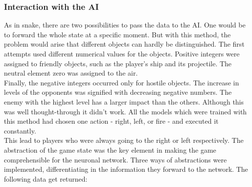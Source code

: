 \documentclass[12pt]{article}
\begin{document}
\subsubsection{Interaction with the AI}
As in snake, there are two possibilities to pass the data to the \gls{AI}. One would be to forward the whole state at a specific moment. But with this method, the problem would arise that different objects can hardly be distinguished. The first attempts used different numerical values for the objects. Positive integers were assigned to friendly objects, such as the player's ship and its projectile. The neutral element zero was assigned to the air. \\
Finally, the negative integers occurred only for hostile objects. The increase in levels of the opponents was signified with decreasing negative numbers. The enemy with the highest level has a larger impact than the others. Although this was well thought-through it didn't work. All the models which were trained with this method had chosen one action - right, left, or fire - and executed it constantly. \\
This lead to players who were always going to the right or left respectively. The abstraction of the game state was the key element in making the game comprehensible for the neuronal network. Three ways of abstractions were implemented, differentiating in the information they forward to the network. The following data get returned:
\end{document}
